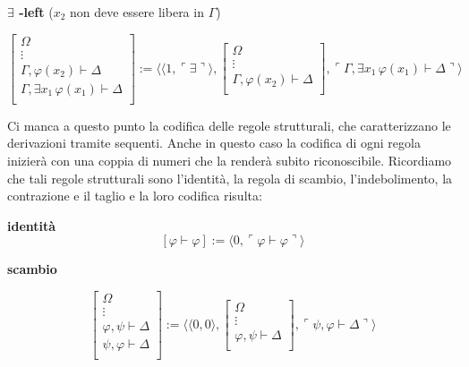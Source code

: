 \vspace{0.5cm}

\textbf{$\exists$ -left} ($x_2$ non deve essere libera in $\Gamma$)



$$
\left [
\begin{array}{c}
\Omega\\
\vdots\\
\Gamma, \varphi(x_2) \vdash \Delta\\
\hline
\Gamma, \exists x_1\,\varphi(x_1) \vdash \Delta\\
\end{array}
\right ]
:= \langle \langle 1,\ulcorner \exists \urcorner \rangle ,
\left [
\begin{array}{c}
\Omega\\
\vdots\\
\Gamma, \varphi(x_2) \vdash \Delta\\
\end{array}
\right ],
\ulcorner \Gamma, \exists x_1\,\varphi(x_1) \vdash \Delta \urcorner \rangle
$$




Ci manca a questo punto la codifica delle regole strutturali, che caratterizzano le derivazioni tramite sequenti. Anche in questo caso la codifica di ogni regola inizier\`a con una coppia di numeri che la render\`a subito riconoscibile. Ricordiamo che tali regole strutturali sono l'identit\`a, la regola di scambio, l'indebolimento, la contrazione e il taglio e la loro codifica risulta:


\vspace{0.5cm}
\textbf{identit\`a}
$$
[ \varphi \vdash \varphi ] := \langle 0, \ulcorner \varphi \vdash \varphi \urcorner \rangle
$$

\vspace{0.5cm}

\textbf{scambio}

$$
\left [
\begin{array}{c}
\Omega\\
\vdots\\
\varphi, \psi \vdash \Delta\\
\hline
\psi, \varphi \vdash \Delta\\
\end{array}
\right ]
:= \langle \langle 0, 0\rangle ,
\left [
\begin{array}{c}
\Omega\\
\vdots\\
\varphi, \psi \vdash \Delta\\
\end{array}
\right ],
\ulcorner \psi, \varphi \vdash \Delta \urcorner \rangle
$$

